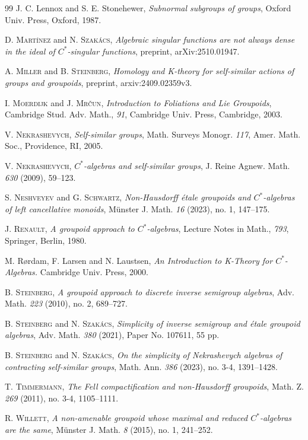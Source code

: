 \documentclass[11pt, oneside, reqno]{amsart}
\theoremstyle{definition}
\theoremstyle{remark}
\numberwithin{equation}{section}
\begin{document}
\begin{thebibliography}{99}
 J. C. Lennox and S. E. Stonehewer, \emph{Subnormal subgroups of groups}, Oxford Univ. Press, Oxford, 1987.

 D. \textsc{Mart\'inez} and N. \textsc{Szak\'acs}, \emph{Algebraic singular functions are not always dense in the ideal of $C^*$-singular functions}, preprint, arXiv:2510.01947.

 A. \textsc{Miller} and B. \textsc{Steinberg}, \emph{Homology and K-theory for self-similar actions of groups and groupoids}, preprint, arxiv:2409.02359v3.

 I. \textsc{Moerdijk} and J. \textsc{Mr\v cun}, \emph{Introduction to Foliations and Lie Groupoids}, Cambridge Stud. Adv. Math., \emph{91}, Cambridge Univ. Press, Cambridge, 2003.

 V. \textsc{Nekrashevych}, \emph{Self-similar groups}, Math. Surveys Monogr. \emph{117}, Amer. Math. Soc., Providence, RI, 2005.

 V. \textsc{Nekrashevych}, \emph{$C^*$-algebras and self-similar groups}, J. Reine Agnew. Math. \emph{630} (2009), 59--123.

 S. \textsc{Neshveyev} and G. \textsc{Schwartz}, \emph{Non-Hausdorff {\'e}tale groupoids and $C^*$-algebras of left cancellative monoids}, M{\"u}nster J. Math. \emph{16} (2023), no. 1, 147--175.

 J. \textsc{Renault}, \emph{A groupoid approach to $C^*$-algebras}, Lecture Notes in Math., \emph{793}, Springer, Berlin, 1980.

 M. Rørdam, F. Larsen and N. Laustsen, \emph{An Introduction to K-Theory for $C^{*}$-Algebras.} Cambridge Univ. Press, 2000.

 B. \textsc{Steinberg}, \emph{A groupoid approach to discrete inverse semigroup algebras}, Adv. Math. \emph{223} (2010), no. 2, 689--727.

 B. \textsc{Steinberg} and N. \textsc{Szak{\'a}cs}, \emph{Simplicity of inverse semigroup and {\'e}tale groupoid algebras}, Adv. Math. \emph{380} (2021), Paper No. 107611, 55 pp.

 B. \textsc{Steinberg} and N. \textsc{Szak{\'a}cs}, \emph{On the simplicity of Nekrashevych algebras of contracting self-similar groups}, Math. Ann. \emph{386} (2023), no. 3-4, 1391--1428.

 T. \textsc{Timmermann}, \emph{The Fell compactification and non-Hausdorff groupoids}, Math. Z. \emph{269} (2011), no. 3-4, 1105--1111.

 R. \textsc{Willett}, \emph{A non-amenable groupoid whose maximal and reduced $C^*$-algebras are the same}, M{\"u}nster J. Math. \emph{8}
(2015), no. 1, 241--252.

\end{thebibliography}
\end{document}
